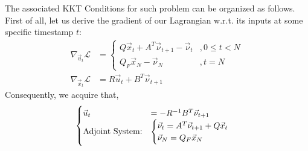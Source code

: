 The associated KKT Conditions for such problem can be organized as follows. \\
First of all, let us derive the gradient of our Lagrangian w.r.t. its inputs at some specific timestamp $t$:
\begin{align*}
    \nabla_{\vec{u}_t} \mathcal{L} &=
    \begin{cases}
        Q \vec{x}_t + A^T \vec{\nu}_{t + 1} - \vec{\nu}_t &, 0 \leq t < N \\
        Q_F \vec{x}_N - \vec{\nu}_N &, t = N
    \end{cases} \\
    \nabla_{\vec{x}_t} \mathcal{L} &= R \vec{u}_t + B^T \vec{\nu}_{t + 1}
\end{align*}
Consequently, we acquire that,
\[
    \begin{cases}
        \vec{u}_t &= - R^{-1} B^T \vec{\nu}_{t + 1} \\
        \text{\rm Adjoint System:}
        &\begin{cases}
            \vec{\nu}_t = A^T \vec{\nu}_{t + 1} + Q \vec{x}_t \\
            \vec{\nu}_N = Q_F \vec{x}_N
        \end{cases}
    \end{cases}
\]

